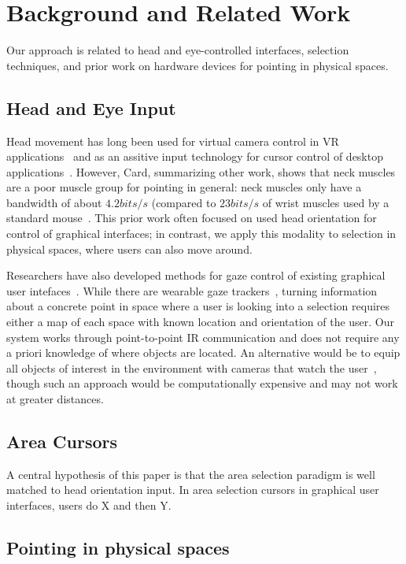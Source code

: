 \section{Background and Related Work}
Our approach is related to head and eye-controlled interfaces, selection techniques, and prior work on hardware devices for pointing in physical spaces.
\subsection{Head and Eye Input}
Head movement has long been used for virtual camera control in VR applications~\cite{pausch_user_1993} and as an assitive input technology for cursor control of desktop applications~\cite{radwin1990method}. However,
Card, summarizing other work, shows that neck muscles are a poor muscle group for pointing in general: neck muscles only have a bandwidth of about $4.2bits/s$ (compared to $23bits/s$ of wrist muscles used by a standard mouse~\cite{Card:1991:MAD:123078.128726}. This prior work often focused on used head orientation for control of graphical interfaces; in contrast, we apply this modality to selection in physical spaces, where users can also move around.

Researchers have also developed methods for gaze control of existing graphical user intefaces~\cite{kumar2007eyepoint}. While there are wearable gaze trackers~\cite{bulling2009wearable}, turning information about a concrete point in space where a user is looking into a selection requires either a map of each space with known location and orientation of the user. Our system works through point-to-point IR communication and does not require any a priori knowledge of where objects are located. An alternative would be to equip all objects of interest in the environment with cameras that watch the user~\cite{smith2013gaze}, though such an approach would be computationally expensive and may not work at greater distances.

\subsection{Area Cursors}
A central hypothesis of this paper is that the area selection paradigm is well matched to head orientation input. In area selection cursors in graphical user interfaces, users do X and then Y.

\subsection{Pointing in physical spaces}

